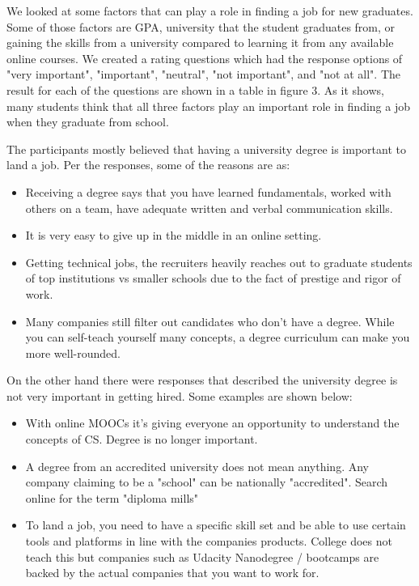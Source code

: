 \documentclass{sigchi}
\begin{document}
We looked at some factors that can play a role in finding a job for new graduates. Some of those factors are GPA, university that the student graduates from, or gaining the skills from a university compared to learning it from any available online courses. We created a rating questions which had the response options of "very important", "important", "neutral", "not important", and "not at all". The result for each of the questions are shown in a table in figure 3. As it shows, many students think that all three factors play an important role in finding a job when they graduate from school.

The participants mostly believed that having a university degree is important to land a job. Per the responses, some of the reasons are as:
\begin{itemize}
	\item Receiving a degree says that you have learned fundamentals, worked with others on a team, have adequate written and verbal communication skills.
	\item It is very easy to give up in the middle in an online setting.
	\item Getting technical jobs, the recruiters heavily reaches out to graduate students of top institutions vs smaller schools due to the fact of prestige and rigor of work.
	\item Many companies still filter out candidates who don't have a degree. While you can self-teach yourself many concepts, a degree curriculum can make you more well-rounded.
\end{itemize}

On the other hand there were responses that described the university degree is not very important in getting hired. Some examples are shown below:
\begin{itemize}
	\item With online MOOCs it's giving everyone an opportunity to understand the concepts of CS. Degree is no longer important.
	\item A degree from an accredited university does not mean anything. Any company claiming to be a "school" can be nationally "accredited". Search online for the term "diploma mills"
	\item To land a job, you need to have a specific skill set and be able to use certain tools and platforms in line with the companies products. College does not teach this but companies such as Udacity Nanodegree / bootcamps are backed by the actual companies that you want to work for.
\end{itemize}
\end{document}
